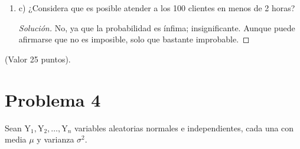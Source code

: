 \documentclass[a4paper,12pt]{article}
\newenvironment{solution}
  {\renewcommand\qedsymbol{$\blacksquare$}\begin{proof}[Solución]}
  {\end{proof}}
\begin{document}
\begin{enumerate}
\begin{solution}
 \end{solution}

 \item c) ¿Considera que es posible atender a los 100 clientes en menos de 2 horas? 
 \begin{solution}
No, ya que la probabilidad es ínfima; insignificante. Aunque puede afirmarse que no es imposible, solo que bastante improbable. 
\end{solution}
 \end{enumerate}
 (Valor 25 puntos).
\section{Problema 4} Sean $\mathrm{Y}_{1}, \mathrm{Y}_{2}, \ldots, \mathrm{Y}_{n}$ variables aleatorias normales e independientes, cada una con media $\mu$ y varianza $\sigma^{2}$.
\end{document}
